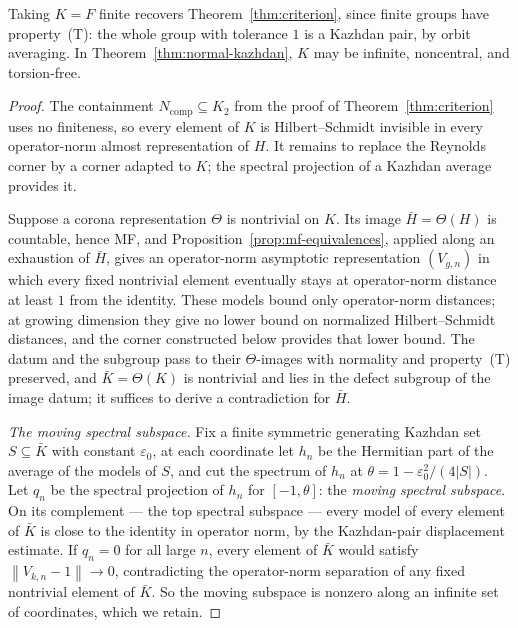\documentclass[11pt]{amsart}
\newcommand{\leanverified}[2]{\ignorespaces}
\theoremstyle{definition}
\theoremstyle{remark}
\theoremstyle{plain}
\newcommand{\opnorm}[1]{\left\lVert #1\right\rVert}
\begin{document}
Taking $K=F$ finite recovers Theorem~\ref{thm:criterion}, since finite
groups have property~\textup{(T)}: the whole group with tolerance $1$
is a Kazhdan pair, by orbit averaging.
\leanverified{Sofic/NormalKazhdanMFRadical}{GroupApproximation.hasKazhdanPropertyT_of_finite}
In Theorem~\ref{thm:normal-kazhdan}, $K$ may be infinite, noncentral,
and torsion-free.

\begin{proof}
The containment $N_{\mathrm{comp}}\subseteq K_2$ from the proof of
Theorem~\ref{thm:criterion} uses no finiteness, so every element of
$K$ is Hilbert--Schmidt invisible in every operator-norm almost
representation of $H$.  It remains to replace the Reynolds corner by
a corner adapted to $K$; the spectral projection of a Kazhdan average
provides it.

Suppose a corona representation $\Theta$ is nontrivial on $K$.  Its
image $\bar H=\Theta(H)$ is countable, hence MF, and
Proposition~\ref{prop:mf-equivalences}, applied along an exhaustion of
$\bar H$, gives an operator-norm asymptotic representation
$(V_{g,n})$ in which every fixed nontrivial element eventually stays
at operator-norm distance at least $1$ from the identity.  These
models bound only operator-norm distances; at growing dimension they
give no lower bound on normalized Hilbert--Schmidt distances, and the
corner constructed below provides that lower bound.  The datum and the
subgroup pass to their $\Theta$-images with normality and
property~\textup{(T)} preserved, and $\bar K=\Theta(K)$ is nontrivial
and lies in the defect subgroup of the image datum; it suffices to
derive a contradiction for $\bar H$.

\emph{The moving spectral subspace.}  Fix a finite symmetric
generating Kazhdan set $S\subseteq\bar K$ with constant
$\varepsilon_0$, at each coordinate let $h_n$ be the Hermitian part of
the average of the models of $S$, and cut the spectrum of $h_n$ at
$\theta=1-\varepsilon_0^2/(4|S|)$.  Let $q_n$ be the spectral
projection of $h_n$ for $[-1,\theta]$: the \emph{moving spectral
subspace}.  On
its complement --- the top spectral subspace --- every model of every
element of $\bar K$ is close to the identity in operator norm, by the
Kazhdan-pair displacement estimate.  If $q_n=0$ for all large $n$,
every element of $\bar K$ would satisfy $\opnorm{V_{k,n}-1}\to0$,
contradicting the operator-norm separation of any fixed nontrivial
element of $\bar K$.  So the moving subspace is nonzero along an
infinite set of coordinates, which we retain.


\end{proof}
\end{document}
